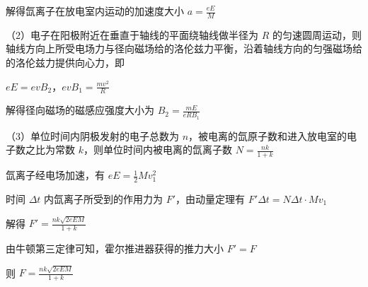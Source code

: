 \documentclass[\gkver]{gaokaozhenti}
\begin{document}
\begin{enumerate}
{解得氙离子在放电室内运动的加速度大小 $a = \frac{eE}{M}$

（2）电子在阳极附近在垂直于轴线的平面绕轴线做半径为 $R$ 的匀速圆周运动，则轴线方向上所受电场力与径向磁场给的洛伦兹力平衡，沿着轴线方向的匀强磁场给的洛伦兹力提供向心力，即

$eE = evB_{2}$，$evB_{1} = \frac{mv^{2}}{R}$

解得径向磁场的磁感应强度大小为 $B_{2} = \frac{mE}{eRB_{1}}$

（3）单位时间内阴极发射的电子总数为 $n$，被电离的氙原子数和进入放电室的电子数之比为常数 $k$，则单位时间内被电离的氙离子数 $N = \frac{nk}{1 + k}$

氙离子经电场加速，有 $eE = \frac{1}{2}Mv_{1}^{2}$

时间 $\Delta t$ 内氙离子所受到的作用力为 $F'$，由动量定理有 $F'\Delta t = N\Delta t\cdot Mv_{1}$

解得 $F' = \frac{nk\sqrt{2eEM}}{1 + k}$

由牛顿第三定律可知，霍尔推进器获得的推力大小 $F' = F$

则 $F = \frac{nk\sqrt{2eEM}}{1 + k}$
}

\end{enumerate}
\end{document}
